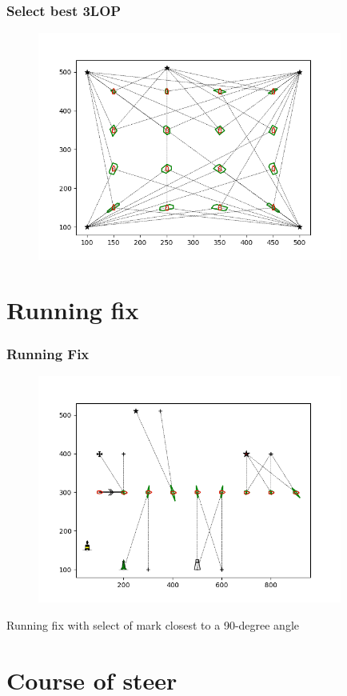 \documentclass{beamer}
\begin{document}
\begin{frame}
    \frametitle{Select best 3LOP}
    \begin{figure}[h]
    \centering
    \includegraphics[width=10cm]{./pictures/select_3LOP.png}
    \end{figure}
\end{frame}

\section{Running fix}

\begin{frame}
    \frametitle{Running Fix}
    \begin{figure}[h]
    \centering
    \includegraphics[width=10cm]{./pictures/runing_fix.png}
    \end{figure}
    Running fix with select of mark closest to a 90-degree angle
\end{frame}

\section{Course of steer}
\end{document}
